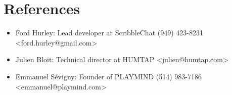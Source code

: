 \documentclass[10pt,a4paper,sans]{moderncv}        %
\begin{document}
\section{References}
\begin{cvcolumns}
  \cvcolumn{}
  {\begin{itemize}
  \item Ford Hurley: Lead developer at ScribbleChat (949) 423-8231 <ford.hurley@gmail.com>
  \item Julien Bloit: Technical director at HUMTAP <julien@humtap.com>
  \item Emmanuel Sévigny: Founder of PLAYMIND (514) 983-7186 <emmanuel@playmind.com>
  \end{itemize}}
\end{cvcolumns}

% 


\end{document}
